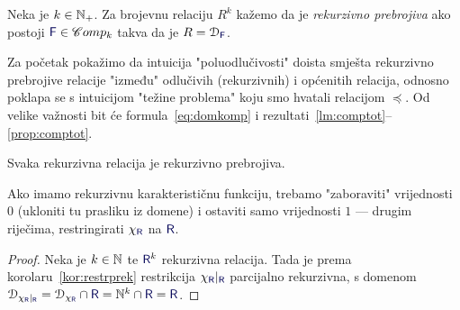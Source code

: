 \begin{definicija}[{name=[rekurzivna prebrojivost]}]\label{def:re}
Neka je $k\in{\mathbb N}_+$. Za brojevnu relaciju $R^k$ kažemo da je \emph{rekurzivno prebrojiva} ako postoji $\f F\in\mathscr Comp_k$ takva da je $R=\dom{\f F}$.
\end{definicija}



Za početak pokažimo da intuicija "poluodlučivosti" doista smješta rekurzivno prebrojive relacije "između" odlučivih (rekurzivnih) i općenitih relacija, odnosno poklapa se s intuicijom "težine problema" koju smo hvatali relacijom $\preceq$. Od velike važnosti bit će formula~\eqref{eq:domkomp} i rezultati~\ref{lm:comptot}--\ref{prop:comptot}.

\begin{propozicija}[{name=[rekurzivna prebrojivost rekurzivnih relacija]}]\label{pp:rekire}
Svaka rekurzivna relacija je rekurzivno prebrojiva.
\end{propozicija}
Ako imamo rekurzivnu karakterističnu funkciju, trebamo "zaboraviti" vrijednosti~$0$ (ukloniti tu prasliku iz domene) i ostaviti samo vrijednosti $1$ --- drugim riječima, restringirati $\chi_{\f R}$ na $\f R$.
\begin{proof}
Neka je $k\in{\mathbb N}$ te $\f R^k$ rekurzivna relacija. Tada je prema korolaru~\ref{kor:restrprek} restrikcija $\chi_{\f R}|_{\f R}$ parcijalno rekurzivna, s domenom $\dom{\chi_{\f R}|_{\f R}}=\dom{\chi_{\f R}}\cap\f R=\N^k\cap\f R=\f R$.
\end{proof}

%
%
%

